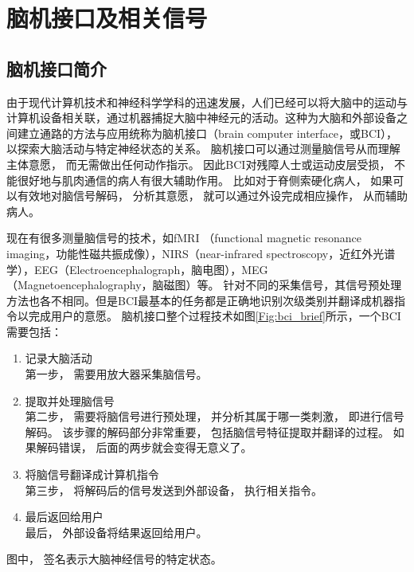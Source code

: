 \chapter{脑机接口及相关信号}

\section{脑机接口简介}

由于现代计算机技术和神经科学学科的迅速发展，人们已经可以将大脑中的运动与计算机设备相关联，通过机器捕捉大脑中神经元的活动\cite{wolpaw2002brain}。这种为大脑和外部设备之间建立通路的方法与应用统称为脑机接口（brain computer interface，或BCI）\cite{van2009brain,donoghue2002connecting}，以探索大脑活动与特定神经状态的关系。 脑机接口可以通过测量脑信号从而理解主体意愿， 而无需做出任何动作指示\cite{kostov2000parallel,allison2007brain,birbaumer2007brain}。 因此BCI对残障人士或运动皮层受损， 不能很好地与肌肉通信的病人有很大辅助作用。 比如对于脊侧索硬化\cite{allison2007brain}病人， 如果可以有效地对脑信号解码， 分析其意愿， 就可以通过外设完成相应操作， 从而辅助病人。 

现在有很多测量脑信号的技术，如fMRI （functional magnetic resonance imaging，功能性磁共振成像），NIRS（near-infrared spectroscopy，近红外光谱学），EEG（Electroencephalograph，脑电图），MEG（Magnetoencephalography，脑磁图）等。 针对不同的采集信号，其信号预处理方法也各不相同。但是BCI最基本的任务都是正确地识别次级类别并翻译成机器指令以完成用户的意愿。 脑机接口整个过程技术如图\ref{Fig:bci_brief}所示\cite{farwell1988talking}，一个BCI需要包括：

\begin{enumerate}
\item{记录大脑活动}\\
	第一步， 需要用放大器采集脑信号。 
\item{提取并处理脑信号}\\
	第二步， 需要将脑信号进行预处理， 并分析其属于哪一类刺激， 即进行信号解码。 该步骤的解码部分非常重要， 包括脑信号特征提取并翻译的过程。 如果解码错误， 后面的两步就会变得无意义了。
\item{将脑信号翻译成计算机指令}\\
	第三步， 将解码后的信号发送到外部设备， 执行相关指令。
\item{最后返回给用户}\\
	最后， 外部设备将结果返回给用户。
\end{enumerate}

图中， 签名表示大脑神经信号的特定状态。 

